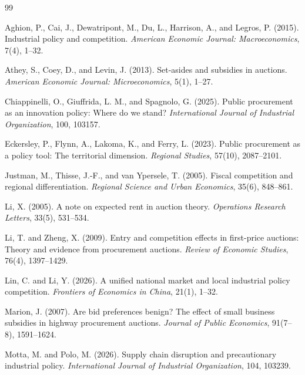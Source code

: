 \begin{thebibliography}{99}

Aghion, P., Cai, J., Dewatripont, M., Du, L., Harrison, A., and Legros, P. (2015).
Industrial policy and competition.
\emph{American Economic Journal: Macroeconomics}, 7(4), 1--32.

Athey, S., Coey, D., and Levin, J. (2013).
Set-asides and subsidies in auctions.
\emph{American Economic Journal: Microeconomics}, 5(1), 1--27.

Chiappinelli, O., Giuffrida, L. M., and Spagnolo, G. (2025).
Public procurement as an innovation policy: Where do we stand?
\emph{International Journal of Industrial Organization}, 100, 103157.

Eckersley, P., Flynn, A., Lakoma, K., and Ferry, L. (2023).
Public procurement as a policy tool: The territorial dimension.
\emph{Regional Studies}, 57(10), 2087--2101.

Justman, M., Thisse, J.-F., and van Ypersele, T. (2005).
Fiscal competition and regional differentiation.
\emph{Regional Science and Urban Economics}, 35(6), 848--861.

Li, X. (2005).
A note on expected rent in auction theory.
\emph{Operations Research Letters}, 33(5), 531--534.

Li, T. and Zheng, X. (2009).
Entry and competition effects in first-price auctions: Theory and evidence from procurement auctions.
\emph{Review of Economic Studies}, 76(4), 1397--1429.

Lin, C. and Li, Y. (2026).
A unified national market and local industrial policy competition.
\emph{Frontiers of Economics in China}, 21(1), 1--32.

Marion, J. (2007).
Are bid preferences benign? The effect of small business subsidies in highway procurement auctions.
\emph{Journal of Public Economics}, 91(7--8), 1591--1624.

Motta, M. and Polo, M. (2026).
Supply chain disruption and precautionary industrial policy.
\emph{International Journal of Industrial Organization}, 104, 103239.


\end{thebibliography}
